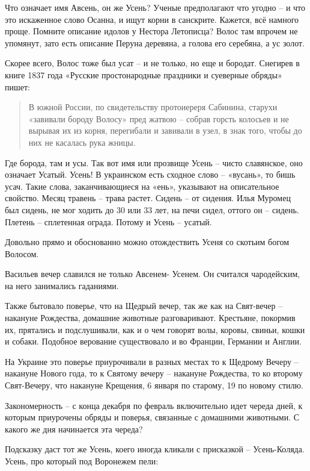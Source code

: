   Что означает имя Авсень, он же Усень? Ученые предполагают что угодно – и что это искаженное слово Осанна, и ищут корни в санскрите. Кажется, всё намного проще. Помните описание идолов у Нестора Летописца? Волос там впрочем не упомянут, зато есть описание Перуна деревяна, а голова его серебяна, а ус золот.

   Скорее всего, Волос тоже был усат – и не только, но еще и бородат. Снегирев в книге 1837 года «Русские простонародные праздники и суеверные обряды» пишет:

\begin{quotation}
В южной России, по свидетельству протоиереря Сабинина, старухи «завивали бороду Волосу» пред жатвою – собрав горсть колосьев и не вырывая их из корня, перегибали и завивали в узел, в знак того, чтобы до них не касалась рука жницы.
\end{quotation}

   Где борода, там и усы. Так вот имя или прозвище Усень – чисто славянское, оно означает Усатый. Усень! В украинском есть сходное слово – «вусань», то бишь усач. Такие слова, заканчивающиеся на «ень», указывают на описательное свойство. Месяц травень – трава растет. Сидень – от сидения. Илья Муромец был сидень, не мог ходить до 30 или 33 лет, на печи сидел, оттого он – сидень. Плетень – сплетенная ограда. Потому и Усень – усатый.

   Довольно прямо и обоснованно можно отождествить Усеня со скотьим богом Волосом.

   Васильев вечер славился не только Авсенем- Усенем. Он считался чародейским, на него занимались гаданиями.

   Также бытовало поверье, что на Щедрый вечер, так же как на Свят-вечер – накануне Рождества, домашние животные разговаривают. Крестьяне, покормив их, прятались и подслушивали, как и о чем говорят волы, коровы, свиньи, кошки и собаки. Подобное верование существовало и во Франции, Германии и Англии. 

   На Украине это поверье приурочивали в разных местах то к Щедрому Вечеру – накануне Нового года, то к Святому вечеру – накануне Рождества, то ко второму Свят-Вечеру, что накануне Крещения, 6 января по старому, 19 по новому стилю.

   Закономерность – с конца декабря по февраль включительно идет череда дней, к которым приурочены обряды и поверья, связанные с домашними животными. С какого же дня начинается эта череда?

   Подсказку даст тот же Усень, коего иногда кликали с присказкой – Усень-Коляда. Усень, про который под Воронежем пели: 

